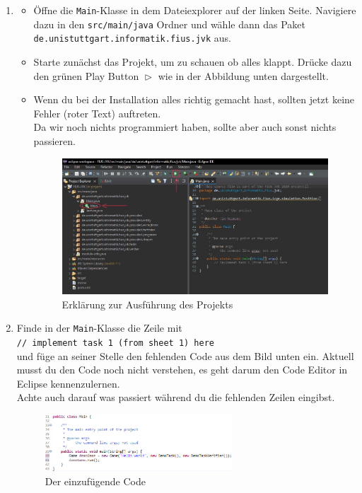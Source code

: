 \begin{enumerate}
    \item
    \begin{itemize}
        \item Öffne die \texttt{Main}-Klasse in dem Dateiexplorer auf der linken Seite. Navigiere dazu in den \texttt{src/main/java} Ordner und wähle dann das Paket \texttt{de.unistuttgart.informatik.fius.jvk} aus.
        \item Starte zunächst das Projekt, um zu schauen ob alles klappt. Drücke dazu den grünen Play Button $\vartriangleright$ wie in der Abbildung unten dargestellt.
        \item Wenn du bei der Installation alles richtig gemacht hast, sollten jetzt keine Fehler (roter Text) auftreten.\\
        Da wir noch nichts programmiert haben, sollte aber auch sonst nichts passieren.
		\begin{figure} [H]
			\centering
			\includegraphics [width=1\textwidth]{./figures/ide.jpg}
			\caption{Erklärung zur Ausführung des Projekts}
		\end{figure}
    \end{itemize}
    \item Finde in der \lstinline{Main}-Klasse die Zeile mit\\
	\hspace*{\fill}\lstinline{// implement task 1 (from sheet 1) here}\hspace*{\fill}\\ und füge an seiner Stelle den fehlenden Code aus dem Bild unten ein.
    Aktuell musst du den Code noch nicht verstehen, es geht darum den Code Editor in Eclipse kennenzulernen.\\
    Achte auch darauf was passiert während du die fehlenden Zeilen eingibst.

	\begin{figure} [H]
		\centering
		\label{code}
		\includegraphics [width=0.66\textwidth]{./figures/code.1.png}
		\caption{Der einzufügende Code}
	\end{figure}


\end{enumerate}
